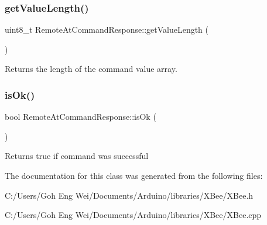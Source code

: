 \subsubsection{\texorpdfstring{get\+Value\+Length()}{getValueLength()}}
{\footnotesize\ttfamily uint8\+\_\+t Remote\+At\+Command\+Response\+::get\+Value\+Length (\begin{DoxyParamCaption}{ }\end{DoxyParamCaption})}

Returns the length of the command value array. \hypertarget{class_remote_at_command_response_a0cef7b3846d9c208ebd7ce4473aa90d3}{}\label{class_remote_at_command_response_a0cef7b3846d9c208ebd7ce4473aa90d3} 
\subsubsection{\texorpdfstring{is\+Ok()}{isOk()}}
{\footnotesize\ttfamily bool Remote\+At\+Command\+Response\+::is\+Ok (\begin{DoxyParamCaption}{ }\end{DoxyParamCaption})}

Returns true if command was successful 

The documentation for this class was generated from the following files\+:\begin{DoxyCompactItemize}
\item 
C\+:/\+Users/\+Goh Eng Wei/\+Documents/\+Arduino/libraries/\+X\+Bee/X\+Bee.\+h\item 
C\+:/\+Users/\+Goh Eng Wei/\+Documents/\+Arduino/libraries/\+X\+Bee/X\+Bee.\+cpp\end{DoxyCompactItemize}
